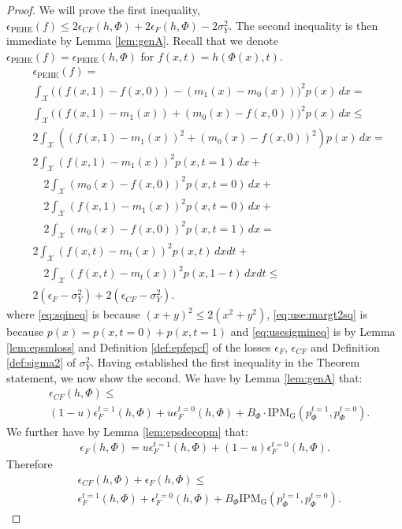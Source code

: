 \documentclass{article}
\def\cX{\mathcal X}
\def\cF{\mathrm{G}}
\def \epehe{\epsilon_{\text{PEHE}}}
\newcommand{\pc}{p^{t=0}}
\newcommand{\pt}{p^{t=1}}
\begin{document}
\begin{proof}
We will prove the first inequality, $\epehe(f) \leq   2\epsilon_{CF}(h,\Phi) + 2\epsilon_F(h,\Phi) - 2\sigma^2_Y$. The second inequality is then immediate by Lemma \ref{lem:genA}.
Recall that we denote $\epehe(f) = \epehe(h,\Phi)$ for $f(x,t) = h(\Phi(x),t)$.
\begin{align}
&\epehe(f) = \nonumber\\
& \int_\cX \bigl(\left(f(x,1) - f(x,0)\right) - \left(m_1(x) - m_0(x)\right) \bigr)^2 p(x) \, dx= \nonumber\\
& \int_\cX \bigl( \left(f(x,1) - m_1(x)\right) + \left(m_0(x) - f(x,0)\right) \bigr)^2 p(x) \, dx \leq  \label{eq:sqineq}\\
&  2\int_\cX \left(\left(  f(x,1) - m_1(x) \right)^2  + \left(m_0(x) - f(x,0) \right)^2\right) p(x) \, dx = \label{eq:use:margt2sq} \\
& 2\int_\cX  \left(f(x,1) - m_1(x)\right)^2  p(x,t=1)  \,dx+ \nonumber \\
& \quad 2\int_\cX \left(m_0(x) - f(x,0) \right)^2  p(x,t=0)  \, dx +  \nonumber\\
& \quad 2\int_\cX  \left(f(x,1) - m_1(x)\right)^2 p(x,t=0)  \, dx+ \nonumber\\
& \quad 2\int_\cX \left(m_0(x) - f(x,0) \right)^2  p(x,t=1)  \, dx \nonumber = \\
&2 \int_\cX \left(f(x,t) - m_t(x)\right)^2 p(x,t) \, dx dt + \nonumber \\
&\quad 2 \int_\cX \left(f(x,t) - m_t(x)\right)^2 p(x,1-t)\, dx dt \leq \label{eq:usesigmineq}\\
&2 (\epsilon_F - \sigma^2_Y) + 2 (\epsilon_{CF} - \sigma^2_Y). \nonumber
\end{align}
where \eqref{eq:sqineq} is because $(x+y)^2 \leq 2(x^2 + y^2)$, \eqref{eq:use:margt2sq} is because $p(x) = p(x,t=0) + p(x,t=1)$ and \eqref{eq:usesigmineq} is by Lemma \ref{lem:epsmloss} and Definition \ref{def:epfepcf} of the losses $\epsilon_F$, $\epsilon_{CF}$ and Definition \ref{def:sigma2} of $\sigma^2_Y$.
Having established the first inequality in the Theorem statement, we now show the second.
We have by Lemma \ref{lem:genA} that:
\begin{align*}
&\epsilon_{CF}(h,\Phi) \leq  \\ 
&(1-u)  \epsilon^{t=1}_F(h,\Phi) + u  \epsilon^{t=0}_F(h,\Phi) +   B_\Phi \cdot \text{IPM}_\cF\left( \pt_\Phi, \pc_\Phi \right).
\end{align*}
We further have by Lemma \ref{lem:epsdecopm} that:
\begin{align*} 
\epsilon_F(h,\Phi) = u \epsilon^{t=1}_F(h,\Phi) + (1-u) \epsilon^{t=0}_F(h,\Phi).
\end{align*}
Therefore 
\begin{align*}
&\epsilon_{CF}(h,\Phi)+\epsilon_F(h,\Phi) \leq  \\
&\epsilon^{t=1}_F(h,\Phi) + \epsilon^{t=0}_F(h,\Phi)+ B_\Phi  \text{IPM}_\cF\left( \pt_\Phi, \pc_\Phi \right).
\end{align*}
\end{proof}
\end{document}

